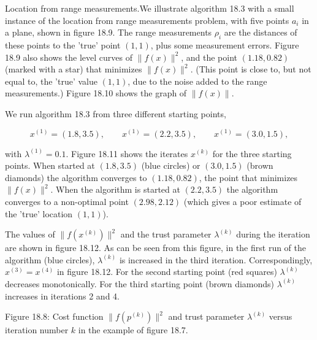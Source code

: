 
Location from range measurements.We illustrate algorithm 18.3 with a small instance of the location from range measurements problem, with five points \(a_{i}\) in a plane, shown in figure 18.9. The range measurements \(\rho_{i}\) are the distances of these points to the 'true' point \((1,1)\), plus some measurement errors. Figure 18.9 also shows the level curves of \(\|f(x)\|^{2}\), and the point \((1.18,0.82)\) (marked with a star) that minimizes \(\|f(x)\|^{2}\). (This point is close to, but not equal to, the 'true' value \((1,1)\), due to the noise added to the range measurements.) Figure 18.10 shows the graph of \(\|f(x)\|\).

We run algorithm 18.3 from three different starting points,

\[x^{(1)}=(1.8,3.5),\qquad x^{(1)}=(2.2,3.5),\qquad x^{(1)}=(3.0,1.5),\]

with \(\lambda^{(1)}=0.1\). Figure 18.11 shows the iterates \(x^{(k)}\) for the three starting points. When started at \((1.8,3.5)\) (blue circles) or \((3.0,1.5)\) (brown diamonds) the algorithm converges to \((1.18,0.82)\), the point that minimizes \(\|f(x)\|^{2}\). When the algorithm is started at \((2.2,3.5)\) the algorithm converges to a non-optimal point \((2.98,2.12)\) (which gives a poor estimate of the 'true' location \((1,1)\)).

The values of \(\|f(x^{(k)})\|^{2}\) and the trust parameter \(\lambda^{(k)}\) during the iteration are shown in figure 18.12. As can be seen from this figure, in the first run of the algorithm (blue circles), \(\lambda^{(k)}\) is increased in the third iteration. Correspondingly, \(x^{(3)}=x^{(4)}\) in figure 18.12. For the second starting point (red squares) \(\lambda^{(k)}\) decreases monotonically. For the third starting point (brown diamonds) \(\lambda^{(k)}\) increases in iterations 2 and 4.

Figure 18.8: Cost function \(\|f(p^{(k)})\|^{2}\) and trust parameter \(\lambda^{(k)}\) versus iteration number \(k\) in the example of figure 18.7.

 